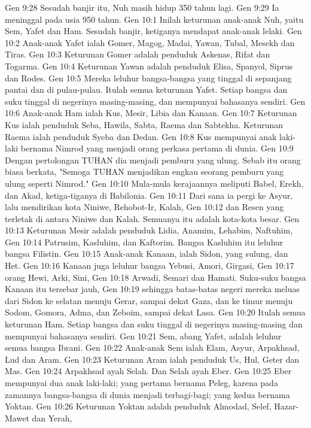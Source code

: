 Gen 9:28  Sesudah banjir itu, Nuh masih hidup 350 tahun lagi.
Gen 9:29  Ia meninggal pada usia 950 tahun.
Gen 10:1  Inilah keturunan anak-anak Nuh, yaitu Sem, Yafet dan Ham. Sesudah banjir, ketiganya mendapat anak-anak lelaki.
Gen 10:2  Anak-anak Yafet ialah Gomer, Magog, Madai, Yawan, Tubal, Mesekh dan Tiras.
Gen 10:3  Keturunan Gomer adalah penduduk Askenas, Rifat dan Togarma.
Gen 10:4  Keturunan Yawan adalah penduduk Elisa, Spanyol, Siprus dan Rodes.
Gen 10:5  Mereka leluhur bangsa-bangsa yang tinggal di sepanjang pantai dan di pulau-pulau. Itulah semua keturunan Yafet. Setiap bangsa dan suku tinggal di negerinya masing-masing, dan mempunyai bahasanya sendiri.
Gen 10:6  Anak-anak Ham ialah Kus, Mesir, Libia dan Kanaan.
Gen 10:7  Keturunan Kus ialah penduduk Seba, Hawila, Sabta, Raema dan Sabtekha. Keturunan Raema ialah penduduk Syeba dan Dedan.
Gen 10:8  Kus mempunyai anak laki-laki bernama Nimrod yang menjadi orang perkasa pertama di dunia.
Gen 10:9  Dengan pertolongan TUHAN dia menjadi pemburu yang ulung. Sebab itu orang biasa berkata, "Semoga TUHAN menjadikan engkau seorang pemburu yang ulung seperti Nimrod."
Gen 10:10  Mula-mula kerajaannya meliputi Babel, Erekh, dan Akad, ketiga-tiganya di Babilonia.
Gen 10:11  Dari sana ia pergi ke Asyur, lalu mendirikan kota Niniwe, Rehobot-Ir, Kalah,
Gen 10:12  dan Resen yang terletak di antara Niniwe dan Kalah. Semuanya itu adalah kota-kota besar.
Gen 10:13  Keturunan Mesir adalah penduduk Lidia, Anamim, Lehabim, Naftuhim,
Gen 10:14  Patrusim, Kasluhim, dan Kaftorim. Bangsa Kasluhim itu leluhur bangsa Filistin.
Gen 10:15  Anak-anak Kanaan, ialah Sidon, yang sulung, dan Het.
Gen 10:16  Kanaan juga leluhur bangsa Yebusi, Amori, Girgasi,
Gen 10:17  orang Hewi, Arki, Sini,
Gen 10:18  Arwadi, Semari dan Hamati. Suku-suku bangsa Kanaan itu tersebar jauh,
Gen 10:19  sehingga batas-batas negeri mereka meluas dari Sidon ke selatan menuju Gerar, sampai dekat Gaza, dan ke timur menuju Sodom, Gomora, Adma, dan Zeboim, sampai dekat Lasa.
Gen 10:20  Itulah semua keturunan Ham. Setiap bangsa dan suku tinggal di negerinya masing-masing dan mempunyai bahasanya sendiri.
Gen 10:21  Sem, abang Yafet, adalah leluhur semua bangsa Ibrani.
Gen 10:22  Anak-anak Sem ialah Elam, Asyur, Arpakhsad, Lud dan Aram.
Gen 10:23  Keturunan Aram ialah penduduk Us, Hul, Geter dan Mas.
Gen 10:24  Arpakhsad ayah Selah. Dan Selah ayah Eber.
Gen 10:25  Eber mempunyai dua anak laki-laki; yang pertama bernama Peleg, karena pada zamannya bangsa-bangsa di dunia menjadi terbagi-bagi; yang kedua bernama Yoktan.
Gen 10:26  Keturunan Yoktan adalah penduduk Almodad, Selef, Hazar-Mawet dan Yerah,
